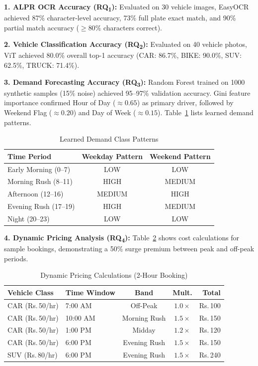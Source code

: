 \documentclass[conference,10pt]{IEEEtran}
\newcommand{\Rs}{\textrm{Rs.\,}}
\begin{document}
\textbf{1. ALPR OCR Accuracy (RQ\textsubscript{1}):} Evaluated on 30 vehicle images, EasyOCR achieved 87\% character-level accuracy, 73\% full plate exact match, and 90\% partial match accuracy ($\geq 80\%$ characters correct).

\textbf{2. Vehicle Classification Accuracy (RQ\textsubscript{2}):} Evaluated on 40 vehicle photos, ViT achieved 80.0\% overall top-1 accuracy (CAR: 86.7\%, BIKE: 90.0\%, SUV: 62.5\%, TRUCK: 71.4\%).

\textbf{3. Demand Forecasting Accuracy (RQ\textsubscript{3}):} Random Forest trained on 1000 synthetic samples (15\% noise) achieved 95--97\% validation accuracy. Gini feature importance confirmed Hour of Day ($\approx 0.65$) as primary driver, followed by Weekend Flag ($\approx 0.20$) and Day of Week ($\approx 0.15$). Table~\ref{tab:demand_pattern} lists learned demand patterns.

\begin{table}[ht]
\centering
\caption{Learned Demand Class Patterns}
\label{tab:demand_pattern}
\footnotesize
\begin{tabular}{@{}l c c@{}}
\toprule
\textbf{Time Period} & \textbf{Weekday Pattern} & \textbf{Weekend Pattern} \\
\midrule
Early Morning (0--7) & LOW & LOW \\
Morning Rush (8--11) & HIGH & MEDIUM \\
Afternoon (12--16) & MEDIUM & HIGH \\
Evening Rush (17--19) & HIGH & MEDIUM \\
Night (20--23) & LOW & LOW \\
\bottomrule
\end{tabular}
\end{table}

\textbf{4. Dynamic Pricing Analysis (RQ\textsubscript{4}):} Table~\ref{tab:pricing_ex} shows cost calculations for sample bookings, demonstrating a 50\% surge premium between peak and off-peak periods.

\begin{table}[ht]
\centering
\caption{Dynamic Pricing Calculations (2-Hour Booking)}
\label{tab:pricing_ex}
\footnotesize
\begin{tabular}{@{}l l c c r@{}}
\toprule
\textbf{Vehicle Class} & \textbf{Time Window} & \textbf{Band} & \textbf{Mult.} & \textbf{Total} \\
\midrule
CAR (\Rs50/hr) & 7:00 AM & Off-Peak & $1.0\times$ & \Rs100 \\
CAR (\Rs50/hr) & 10:00 AM & Morning Rush & $1.5\times$ & \Rs150 \\
CAR (\Rs50/hr) & 1:00 PM & Midday & $1.2\times$ & \Rs120 \\
CAR (\Rs50/hr) & 6:00 PM & Evening Rush & $1.5\times$ & \Rs150 \\
SUV (\Rs80/hr) & 6:00 PM & Evening Rush & $1.5\times$ & \Rs240 \\
\bottomrule
\end{tabular}
\end{table}
\end{document}
